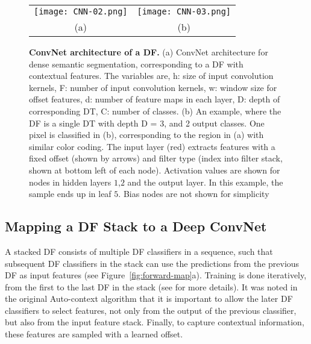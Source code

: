 \documentclass[twocolumn]{svjour3}
\begin{document}
%
\begin{figure*}[htp!]
\begin{center}
\begin{tabular}{cc}
		
   \texttt{[image: CNN-02.png]} &
   \texttt{[image: CNN-03.png]} \\
				   (a) & (b)
\end{tabular}
\end{center}
   \caption{\textbf{ConvNet architecture of a DF. } (a) ConvNet architecture for dense semantic segmentation, corresponding to a DF with contextual features. The variables are, h: size of input convolution kernels, F: number of input convolution kernels, w: window size for offset features, d: number of feature maps in each layer, D: depth of corresponding DT, C: number of classes. (b) An example, where the DF is a single DT with depth D = 3, and 2 output classes. One pixel is classified in (b), corresponding to the region in (a) with similar color coding. The input layer (red) extracts features with a fixed offset (shown by arrows) and filter type (index into filter stack, shown at bottom left of each node). Activation values are shown for nodes in hidden layers $1$,$2$ and the output layer. In this example, the sample ends up in leaf $5$. Bias nodes are not shown for simplicity}
\label{fig:ConvNet}
\end{figure*}

\subsection{Mapping a DF Stack to a Deep ConvNet}
\label{subsec:forward-map}

A stacked DF consists of multiple DF classifiers in a sequence, such that subsequent DF classifiers in the stack can use the predictions from the previous DF as input features (see Figure~\ref{fig:forward-map}a).
Training is done iteratively, from the first to the last DF in the stack (see \cite{Tu2010} for more details).
It was noted in the original Auto-context algorithm that it is important to allow the later DF classifiers to select features, not only from the output of the previous classifier, but also from the input feature stack.
Finally, to capture contextual information, these features are sampled with a learned offset.
\end{document}

